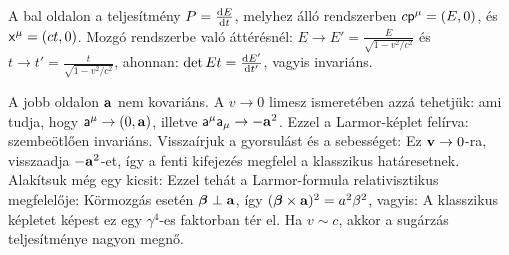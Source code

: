     A bal oldalon a teljesítmény $P=\frac{\mathrm{d} E}{\mathrm{d} t}$, melyhez álló rendszerben $c\mathsf{p}^\mu=(E,0)$, és $\mathsf{x}^\mu=(ct,0)$. Mozgó rendszerbe való áttérésnél: $E\to E'=\frac{E}{\sqrt{1-v^2/c^2}}$ és $t\to t'=\frac{t}{\sqrt{1-v^2/c^2}}$, ahonnan: $\det{E}{t}=\frac{\mathrm{d} E'}{\mathrm{d} t'}$, vagyis invariáns. 
    
    A jobb oldalon $\mathbf{a}$ nem kovariáns. A $v\to 0$ limesz ismeretében azzá tehetjük:
    ami tudja, hogy $\mathsf{a}^\mu\to (0,\mathbf{a})$, illetve $\mathsf{a}^\mu \mathsf{a}_\mu\to -\mathbf{a}^2$. Ezzel a Larmor-képlet felírva:
    szembeötlően invariáns. Visszaírjuk a gyorsulást és a sebességet:
    Ez $\mathbf{v}\to 0$-ra, visszaadja $-\mathbf{a}^2$-et, így a fenti kifejezés megfelel a klasszikus határesetnek. Alakítsuk még egy kicsit:
    Ezzel tehát a Larmor-formula relativisztikus megfelelője:
    Körmozgás esetén $\boldsymbol{\beta}\perp\mathbf{a}$, így $(\boldsymbol{\beta}\times\mathbf{a})^2=a^2\beta^2$, vagyis:
    A klasszikus képletet képest ez egy $\gamma^4$-es faktorban tér el. Ha $v\sim c$, akkor a sugárzás teljesítménye nagyon megnő.
    
